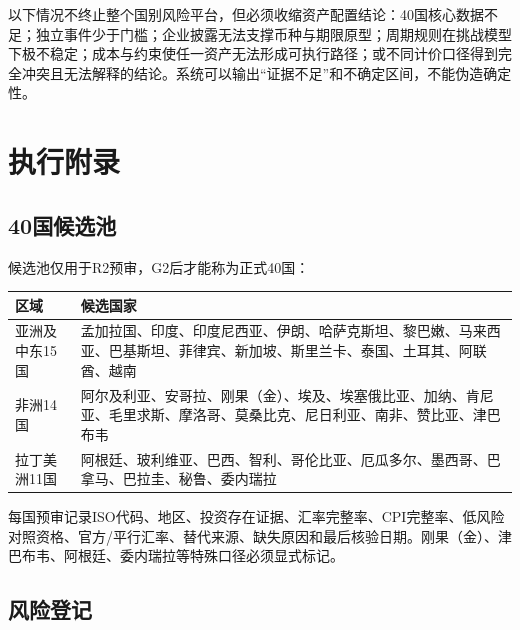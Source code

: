 \documentclass[UTF8,fontset=windows,12pt,openany]{ctexbook}
\begin{document}
以下情况不终止整个国别风险平台，但必须收缩资产配置结论：40国核心数据不足；独立事件少于门槛；企业披露无法支撑币种与期限原型；周期规则在挑战模型下极不稳定；成本与约束使任一资产无法形成可执行路径；或不同计价口径得到完全冲突且无法解释的结论。系统可以输出“证据不足”和不确定区间，不能伪造确定性。

\appendix
\part{执行附录}

\chapter{40国候选池}

候选池仅用于R2预审，G2后才能称为正式40国：

\begin{longtable}{p{2.4cm}p{10.6cm}}
\toprule
\textbf{区域} & \textbf{候选国家}\\
\midrule
亚洲及中东15国 & 孟加拉国、印度、印度尼西亚、伊朗、哈萨克斯坦、黎巴嫩、马来西亚、巴基斯坦、菲律宾、新加坡、斯里兰卡、泰国、土耳其、阿联酋、越南\\
非洲14国 & 阿尔及利亚、安哥拉、刚果（金）、埃及、埃塞俄比亚、加纳、肯尼亚、毛里求斯、摩洛哥、莫桑比克、尼日利亚、南非、赞比亚、津巴布韦\\
拉丁美洲11国 & 阿根廷、玻利维亚、巴西、智利、哥伦比亚、厄瓜多尔、墨西哥、巴拿马、巴拉圭、秘鲁、委内瑞拉\\
\bottomrule
\end{longtable}

每国预审记录ISO代码、地区、投资存在证据、汇率完整率、CPI完整率、低风险对照资格、官方/平行汇率、替代来源、缺失原因和最后核验日期。刚果（金）、津巴布韦、阿根廷、委内瑞拉等特殊口径必须显式标记。

\chapter{风险登记}
\end{document}

